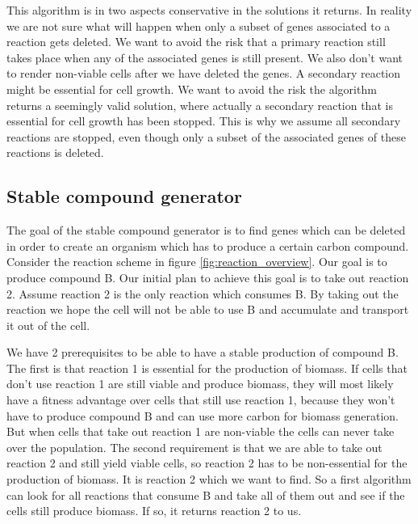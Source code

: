 \documentclass[10pt]{report}
\begin{document}
This algorithm is in two aspects conservative in the solutions it returns.
In reality we are not sure what will happen when only a subset of genes associated to a reaction gets deleted. We want to avoid the risk that a primary reaction still takes place when any of the associated genes is still present. We also don't want to render non-viable cells after we have deleted the genes. A secondary reaction might be essential for cell growth. We want to avoid the risk the algorithm returns a seemingly valid solution, where actually a secondary reaction that is essential for cell growth has been stopped. This is why we assume all secondary reactions are stopped, even though only a subset of the associated genes of these reactions is deleted.

\subsection{Stable compound generator}
The goal of the stable compound generator is to find genes which can be deleted in order to create an organism which has to produce a certain carbon compound. Consider the reaction scheme in figure \ref{fig:reaction_overview}. Our goal is to produce compound B. Our initial plan to achieve this goal is to take out reaction 2. Assume reaction 2 is the only reaction which consumes B. By taking out the reaction we hope the cell will not be able to use B and accumulate and transport it out of the cell.

We have 2 prerequisites to be able to have a stable production of compound B. The first is that reaction 1 is essential for the production of biomass. If cells that don't use reaction 1 are still viable and produce biomass, they will most likely have a fitness advantage over cells that still use reaction 1, because they won't have to produce compound B and can use more carbon for biomass generation. But when cells that take out reaction 1 are non-viable the cells can never take over the population.
The second requirement is that we are able to take out reaction 2 and still yield viable cells, so reaction 2 has to be non-essential for the production of biomass. It is reaction 2 which we want to find. So a first algorithm can look for all reactions that consume B and take all of them out and see if the cells still produce biomass. If so, it returns reaction 2 to us.
\end{document}
